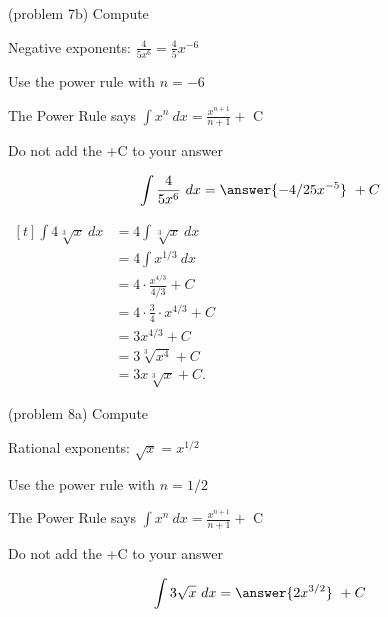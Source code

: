 \documentclass[handout]{ximera}
\begin{document}
\begin{problem}(problem 7b)
Compute 

\begin{hint}
Negative exponents: $\frac{4}{5x^6} = \frac45 x^{-6}$
\end{hint}
\begin{hint}
Use the power rule with $n=-6$
\end{hint}
\begin{hint}
The Power Rule says $\int x^n \ dx = \frac{x^{n+1}}{n+1} +$ C
\end{hint}
\begin{hint}
Do not add the +C to your answer
\end{hint}

\[
\int \frac{4}{5x^6} \ dx =
\answer{-4/25 x^{-5}} \ + C
\]
\end{problem}


\begin{example}[example 8]
$\begin{aligned}[t]
\int 4\sqrt[3]x  \ dx &= 4 \int \sqrt[3] x \  dx  \\
&= 4 \int x^{1/3} \ dx \\
&= 4 \cdot \frac{x^{4/3}}{4/3} +C \\[3pt]
&= 4 \cdot \frac{3}{4} \cdot x^{4/3} +C \\[3pt]
&= 3x^{4/3} +C \\
&= 3\sqrt[3] {x^4} +C \\
&= 3x\sqrt[3] x +C.
\end{aligned}$
\end{example}


\begin{problem}(problem 8a)
Compute 

\begin{hint}
Rational exponents: $\sqrt x = x^{1/2}$
\end{hint}
\begin{hint}
Use the power rule with $n=1/2$
\end{hint}
\begin{hint}
The Power Rule says $\int x^n \ dx = \frac{x^{n+1}}{n+1} +$ C
\end{hint}
\begin{hint}
Do not add the +C to your answer
\end{hint}

\[
\int 3\sqrt x \ dx =
\answer{2x^{3/2}} \ + C
\]
\end{problem}
\end{document}
